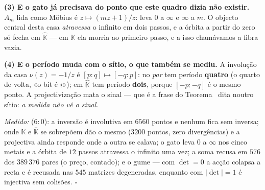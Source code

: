 \documentclass[livro.tex]{subfiles}
\begin{document}
\begin{corolario}
\textbf{(3) E o gato já precisava do ponto que este quadro dizia não
existir.} $A_{m}$ lida como Möbius é $z\mapsto(mz+1)/z$: leva $0$ a
$\infty$ e $\infty$ a $m$. O objecto central desta casa \emph{atravessa}
o infinito em dois passos, e a órbita a partir do zero só fecha em
$\widehat{\mathbb{K}}$ --- em $\mathbb{K}$ ela morria ao primeiro passo,
e a isso chamávamos a fibra vazia.

\textbf{(4) E o período muda com o sítio, o que também se mediu.} A
involução da casa $\nu(z)=-1/z$ é $[p:q]\mapsto[-q:p]$: no \emph{par}
tem período \textbf{quatro} (o quarto de volta, «o bit é $i$»); em
$\widehat{\mathbb{K}}$ tem período \textbf{dois}, porque $[-p:-q]$ é o
mesmo ponto. A projectivização mata o sinal --- que é a frase do
Teorema~ dita noutro sítio: \emph{a medida não vê o sinal}.

\emph{Medido:}  ($6{:}0$): a inversão é
involutiva em $6560$ pontos e nenhum fica sem inversa; onde
$\mathbb{K}$ e $\widehat{\mathbb{K}}$ se sobrepõem dão o mesmo ($3200$
pontos, zero divergências) e a projectiva ainda responde onde a outra se
calava; o gato leva $0$ a $\infty$ nos cinco metais e a órbita de $12$
passos atravessa o infinito uma vez; a soma recusa em $576$ dos
$389\,376$ pares (o preço, contado); e o gume --- com $\det=0$ a acção
colapsa a recta e é recusada nas $545$ matrizes degeneradas, enquanto com
$|\det|=1$ é injectiva sem colisões. $\square$
\end{corolario}
\end{document}
